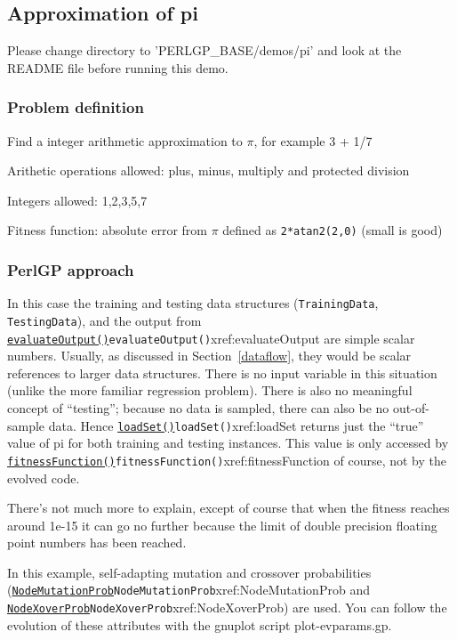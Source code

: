 \documentclass[a4paper]{article}
\begin{document}
\subsection{Approximation of pi}\label{pidemo}

Please change directory to 'PERLGP\_BASE/demos/pi' and look at the
README file before running this demo.

\subsubsection{Problem definition}

Find a integer arithmetic approximation to $\pi$, for example
3 + 1/7

Arithetic operations allowed: plus, minus, multiply and protected division

Integers allowed: 1,2,3,5,7

Fitness function: absolute error from $\pi$ defined as \texttt{2*atan2(2,0)} (small is good)

\subsubsection{PerlGP approach}

In this case the training and testing data structures
(\texttt{TrainingData}, \texttt{TestingData}), and the output from
\hyperref[no]{\texttt{evaluateOutput()}}{\texttt{evaluateOutput()}}{xref:evaluateOutput} are simple scalar numbers.  Usually, as
discussed in Section~\ref{dataflow}, they would be scalar references
to larger data structures.  There is no input variable in this
situation (unlike the more familiar regression problem). There is also
no meaningful concept of ``testing''; because no data is sampled,
there can also be no out-of-sample data.  Hence \hyperref[no]{\texttt{loadSet()}}{\texttt{loadSet()}}{xref:loadSet}
returns just the ``true'' value of pi for both training and testing
instances.  This value is only accessed by \hyperref[no]{\texttt{fitnessFunction()}}{\texttt{fitnessFunction()}}{xref:fitnessFunction}
of course, not by the evolved code.

There's not much more to explain, except of course that when the
fitness reaches around 1e-15 it can go no further because the limit
of double precision floating point numbers has been reached.

In this example, self-adapting mutation and crossover probabilities
(\hyperref[no]{\texttt{NodeMutationProb}}{\texttt{NodeMutationProb}}{xref:NodeMutationProb} and \hyperref[no]{\texttt{NodeXoverProb}}{\texttt{NodeXoverProb}}{xref:NodeXoverProb}) are used.  You
can follow the evolution of these attributes with the gnuplot script
plot-evparams.gp.
\end{document}
